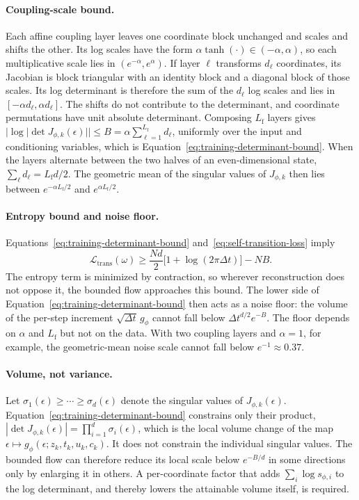 \paragraph{Coupling-scale bound.}
Each affine coupling layer leaves one coordinate block unchanged and scales and shifts the other. Its log scales have the form $\alpha\tanh(\cdot)\in(-\alpha,\alpha)$, so each multiplicative scale lies in $(e^{-\alpha},e^\alpha)$. If layer $\ell$ transforms $d_\ell$ coordinates, its Jacobian is block triangular with an identity block and a diagonal block of those scales. Its log determinant is therefore the sum of the $d_\ell$ log scales and lies in $[-\alpha d_\ell,\alpha d_\ell]$. The shifts do not contribute to the determinant, and coordinate permutations have unit absolute determinant. Composing $L_{\mathrm f}$ layers gives $|\log|\det J_{\phi,k}(\epsilon)||\leq B=\alpha\sum_{\ell=1}^{L_{\mathrm f}} d_\ell$, uniformly over the input and conditioning variables, which is Equation~\eqref{eq:training-determinant-bound}. When the layers alternate between the two halves of an even-dimensional state, $\sum_\ell d_\ell=L_{\mathrm f}d/2$. The geometric mean of the singular values of $J_{\phi,k}$ then lies between $e^{-\alpha L_{\mathrm f}/2}$ and $e^{\alpha L_{\mathrm f}/2}$.

\paragraph{Entropy bound and noise floor.}
Equations~\eqref{eq:training-determinant-bound} and~\eqref{eq:self-transition-loss} imply
\begin{equation}\label{eq:transition-entropy-lower-bound}
 \mathcal L_{\mathrm{trans}}(\omega)
 \geq\frac{Nd}{2}\bigl[1+\log(2\pi\Delta t)\bigr]-NB.
\end{equation}
The entropy term is minimized by contraction, so wherever reconstruction does not oppose it, the bounded flow approaches this bound. The lower side of Equation~\eqref{eq:training-determinant-bound} then acts as a noise floor: the volume of the per-step increment $\sqrt{\Delta t}\,g_\phi$ cannot fall below $\Delta t^{d/2}e^{-B}$. The floor depends on $\alpha$ and $L_{\mathrm f}$ but not on the data. With two coupling layers and $\alpha=1$, for example, the geometric-mean noise scale cannot fall below $e^{-1}\approx0.37$.

\paragraph{Volume, not variance.}
Let $\sigma_1(\epsilon)\geq\cdots\geq\sigma_d(\epsilon)$ denote the singular values of $J_{\phi,k}(\epsilon)$. Equation~\eqref{eq:training-determinant-bound} constrains only their product, $|\det J_{\phi,k}(\epsilon)|=\prod_{i=1}^d\sigma_i(\epsilon)$, which is the local volume change of the map $\epsilon\mapsto g_\phi(\epsilon;z_k,t_k,u_k,c_k)$. It does not constrain the individual singular values. The bounded flow can therefore reduce its local scale below $e^{-B/d}$ in some directions only by enlarging it in others. A per-coordinate factor that adds $\sum_i\log s_{\phi,i}$ to the log determinant, and thereby lowers the attainable volume itself, is required. 


